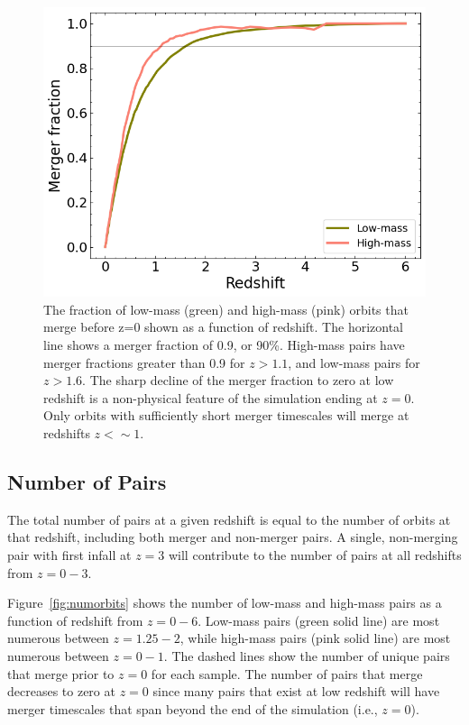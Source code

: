 \documentclass[twocolumn,linenumbers]{aastex631}
\begin{document}
\begin{figure}[htb]
    \begin{center}
    \includegraphics[width=\columnwidth]{plots/bet-on-it/6_mergerfraction.png}
    \caption{The fraction of low-mass (green) and high-mass (pink) orbits that merge before z=0 shown as a function of redshift. 
    The horizontal line shows a merger fraction of 0.9, or 90\%. 
    High-mass pairs have merger fractions greater than 0.9 for $z>1.1$, and low-mass pairs for $z>1.6$.
    The sharp decline of the merger fraction to zero at low redshift is a non-physical feature of the simulation ending at $z=0$.
    Only orbits with sufficiently short merger timescales will merge at redshifts $z<\sim1$.}
    \label{fig:fmerge}
    \end{center}
\end{figure}

\subsection{Number of Pairs}\label{sec:pairprops-num}
The total number of pairs at a given redshift is equal to the number of orbits at that redshift, including both merger and non-merger pairs. 
A single, non-merging pair with first infall at $z=3$ will contribute to the number of pairs at all redshifts from $z=0-3$. 

Figure~\ref{fig:numorbits} shows the number of low-mass and high-mass pairs as a function of redshift from $z=0-6$. 
Low-mass pairs (green solid line) are most numerous between $z=1.25-2$, while high-mass pairs (pink solid line) are most numerous between $z=0-1$.
The dashed lines show the number of unique pairs that merge prior to $z=0$ for each sample. 
The number of pairs that merge decreases to zero at $z=0$ since many pairs that exist at low redshift will have merger timescales that span beyond the end of the simulation (i.e., $z=0$). 
\end{document}
